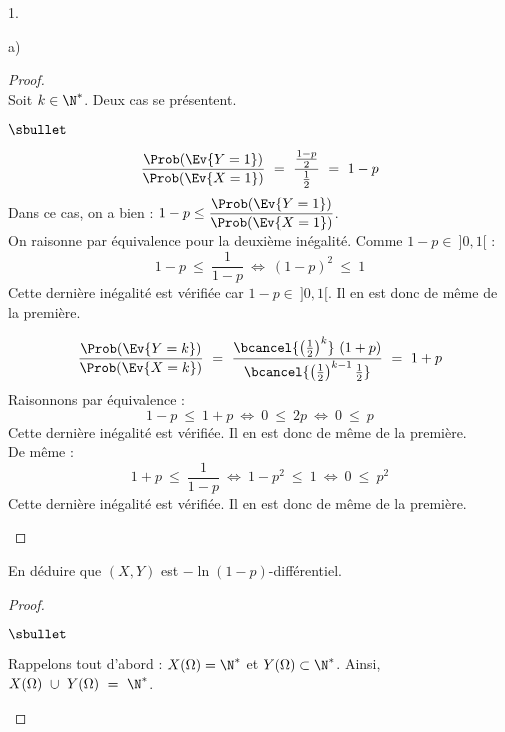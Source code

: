 \begin{noliste}{1.}
\begin{noliste}{a)}
    \begin{proof}~\\%
      Soit $k \in \N^*$. Deux cas se présentent.
      \begin{noliste}{$\sbullet$}
      \item {} 
        \[
        \dfrac{\Prob(\Ev{Y = 1})}{\Prob(\Ev{X = 1})} \ = \
        \dfrac{\frac{1-p}{2}}{\frac{1}{2}} \ = \ 1-p
        \]
        Dans ce cas, on a bien : $1-p \leq \dfrac{\Prob(\Ev{Y = 
	1})}{\Prob(\Ev{X = 1})}$.\\
        On raisonne par équivalence pour la deuxième inégalité. Comme
        $1 - p \in \ ]0, 1[$ :~\\[-.4cm]
        \[
        1-p \ \leq \ \dfrac{1}{1-p} \ \Leftrightarrow \ (1-p)^2 \ \leq
        \ 1
        \]
        Cette dernière inégalité est vérifiée car $1 - p \in \ ]0,
        1[$. Il en est donc de même de la première. %
        \conc{$1-p \ \leq \ \dfrac{\Prob(\Ev{Y = 1})}{\Prob(\Ev{X =
              1})} \ \leq \ \dfrac{1}{1-p}$}

      \item {}
        \[
        \dfrac{\Prob(\Ev{Y = k})}{\Prob(\Ev{X = k})} \ = \
        \dfrac{\bcancel{\left( \frac{1}{2} \right)^{k}} \ (1 +
          p)}{\bcancel{\left( \frac{1}{2} \right)^{k-1} \frac{1}{2}}}
        \ = \ 1+p
        \]
        Raisonnons par équivalence :
        \[
        1 - p \ \leq \ 1 + p \ \Leftrightarrow \ 0 \ \leq \ 2 p \
        \Leftrightarrow \ 0 \ \leq \ p
        \]
        Cette dernière inégalité est vérifiée. Il en est donc de même
        de la première.\\
        De même :
        \[
        1+p \ \leq \ \dfrac{1}{1-p} \ \Leftrightarrow \ 1-p^2 \ \leq \
        1 \ \Leftrightarrow \ 0 \ \leq \ p^2
        \]
        Cette dernière inégalité est vérifiée. Il en est donc de même
        de la première.%
        ~\\[-1.2cm]
      \end{noliste}
    \end{proof}
    
    
    \newpage
    

  \item En déduire que $(X,Y)$ est $-\ln(1-p)$-différentiel.

    \begin{proof}~%
      \begin{noliste}{$\sbullet$}
      \item Rappelons tout d'abord : $X(\Omega) = \N^*$ et $Y(\Omega)
        \subset \N^*$. Ainsi, $X(\Omega) \ \cup \ Y(\Omega) \ = \ \N^*$.


\end{noliste}
\end{proof}
\end{noliste}
\end{noliste}
